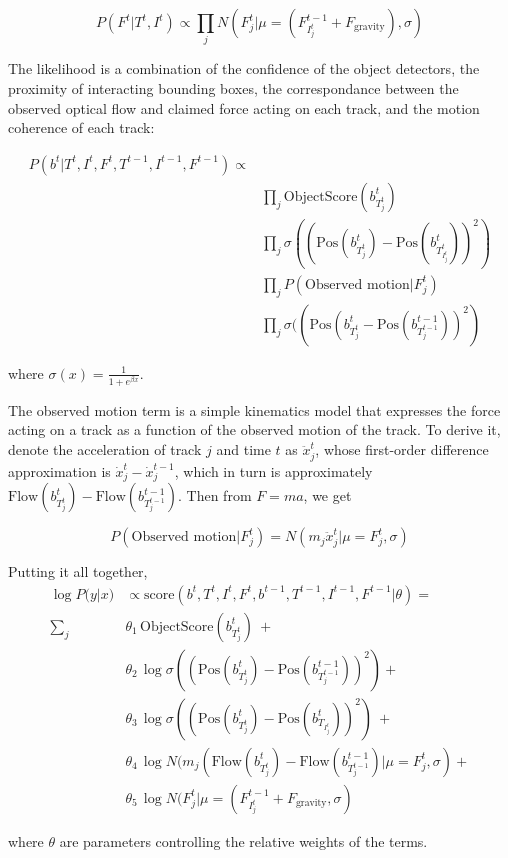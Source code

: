 \documentclass{article}
\begin{document}
\begin{equation}
  P(F^t|T^t, I^t)\propto \prod_j N(F_j^t|\mu=(F_{I_j^t}^{t-1}+F_\text{gravity}),\sigma)
\end{equation}

The likelihood is a combination of the confidence of the object detectors, the proximity of interacting bounding boxes, the correspondance between the observed optical flow and claimed force acting on each track, and the motion coherence of each track:

\begin{equation}
  \begin{split}
  P(b^t|T^t,I^t,F^t,T^{t-1},I^{t-1},F^{t-1})\propto\\
  &\prod_j {\text{ObjectScore}(b_{T_j^t}^t)}\\
  &\prod_j {\sigma((\text{Pos}(b^t_{T_j^t})-\text{Pos}(b^t_{T^t_{I_j^t}}))^2)}\\
  &\prod_j P(\text{Observed motion}|{F_j^t})\\
  &\prod_j \sigma((\text{Pos}(b^t_{T_j^t}-\text{Pos}(b^{t-1}_{T_j^{t-1}}))^2)
\end{split}
\end{equation}

where $\sigma(x)=\frac{1}{1+e^{\beta x}}$.

The observed motion term is a simple kinematics model that expresses the force acting on a track as a function of the observed motion of the track. To derive it, denote the acceleration of track $j$ and time $t$ as $\ddot{x}^t_j$, whose first-order difference approximation is $\dot{x}^t_j - \dot{x}^{t-1}_j$, which in turn is approximately $\text{Flow}(b^t_{T^t_j}) - \text{Flow}(b^{t-1}_{T^{t-1}_j})$. Then from $F=ma$, we get

\begin{equation}
    P(\text{Observed motion}|F_j^t)=N(m_j \ddot{x}^t_j|\mu=F^t_j,\sigma)
\end{equation}

Putting it all together,
\begin{equation}
  \begin{split}
    \log{P(y|x})&\propto \text{score}(b^t,T^t,I^t,F^t, b^{t-1}, T^{t-1}, I^{t-1}, F^{t-1}|\theta)=\\
    \sum_j&\theta_1\, \text{ObjectScore}(b^t_{T^t_j})\ + \\
    &\theta_2\,\log \sigma((\text{Pos}(b^t_{T^t_j})-\text{Pos}(b^{t-1}_{T^{t-1}_j}))^2)+\\
    &\theta_3\,\log \sigma((\text{Pos}(b^t_{T_j^t})-\text{Pos}(b^t_{T_{I_j^t}}))^2)\ +\\
    &\theta_4 \,\log N(m_j(\text{Flow}(b^t_{T^t_j})-\text{Flow}(b^{t-1}_{T^{t-1}_j})|\mu=F^t_j, \sigma) + \\
    &\theta_5 \,\log N(F^t_j|\mu=(F^{t-1}_{I^t_j}+F_\text{gravity}, \sigma)
  \end{split}
\end{equation}

where $\theta$ are parameters controlling the relative weights of the terms.
\end{document}
